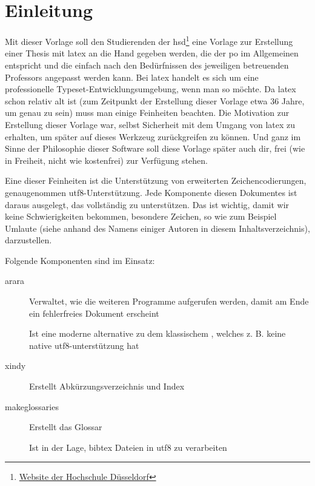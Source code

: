 \newpage

\section{Einleitung}%
\label{sec:einl}
Mit dieser Vorlage soll den Studierenden der \gls{hsd}\footnote{\href{https://www.hs-duesseldorf.de}{Website der Hochschule Düsseldorf}} eine Vorlage zur Erstellung einer Thesis mit \gls{latex} an die Hand gegeben werden, die der \gls{po} im Allgemeinen entspricht und die einfach nach den Bedürfnissen des jeweiligen betreuenden Professors angepasst werden kann. Bei \gls{latex} handelt es sich um eine \glqq professionelle Typeset-Entwicklungsumgebung\grqq, wenn man so möchte. Da \gls{latex} schon
relativ alt ist (zum Zeitpunkt der Erstellung dieser Vorlage etwa 36 Jahre, um genau zu sein) muss man einige Feinheiten beachten. Die Motivation zur Erstellung dieser Vorlage war, selbst Sicherheit mit dem Umgang von \gls{latex} zu erhalten, um später auf dieses Werkzeug zurückgreifen zu können. Und ganz im Sinne der Philosophie dieser Software soll diese Vorlage später auch dir, frei (wie in Freiheit, nicht wie kostenfrei) zur Verfügung stehen.

Eine dieser Feinheiten ist die Unterstützung von erweiterten Zeichencodierungen, genaugenommen \gls{utf8}-Unterstützung.
Jede Komponente diesen Dokumentes ist daraus ausgelegt, das vollständig zu unterstützen. Das ist wichtig, damit wir keine Schwierigkeiten bekommen, \glqq besondere Zeichen\grqq, so wie zum Beispiel Umlaute (siehe anhand des Namens einiger Autoren in diesem Inhaltsverzeichnis), darzustellen.

Folgende Komponenten sind im Einsatz:
\begin{description}
  \item[arara] Verwaltet, wie die weiteren Programme aufgerufen werden, damit am Ende ein fehlerfreies Dokument erscheint
  \item[\protect{}] Ist eine moderne alternative zu dem klassischem \glqq {}\grqq , welches z. B. keine native \gls{utf8}-unterstützung hat
  \item[xindy] Erstellt Abkürzungsverzeichnis und Index
  \item[makeglossaries] Erstellt das Glossar
  \item[\protect{}] Ist in der Lage, bibtex Dateien in \gls{utf8} zu verarbeiten
\end{description}

